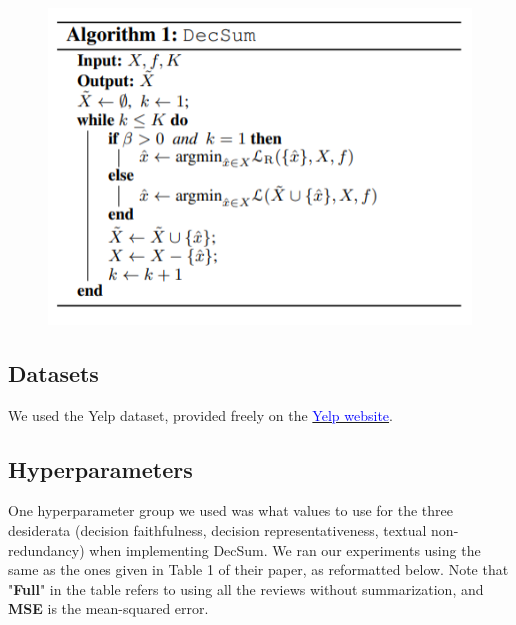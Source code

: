 \documentclass{article}
\newcommand{\blue}[1]{\textcolor{blue}{#1}}
\begin{document}
\begin{figure}[!ht]
    \centering
    \includegraphics[scale=0.6]{../assets/DecSum_Algo}
\end{figure}

\subsection{Datasets}
We used the Yelp dataset, provided freely on the \href{https://www.yelp.com/dataset/download}{\blue{Yelp website}}.

\subsection{Hyperparameters}
One hyperparameter group we used was what values to use for the three desiderata (decision faithfulness, decision representativeness, textual non-redundancy) when implementing DecSum.
We ran our experiments using the same as the ones given in Table 1 of their paper, as reformatted below. Note that "\textbf{Full}" in the table refers to using all the reviews without summarization,
and \textbf{MSE} is the mean-squared error.
\end{document}
